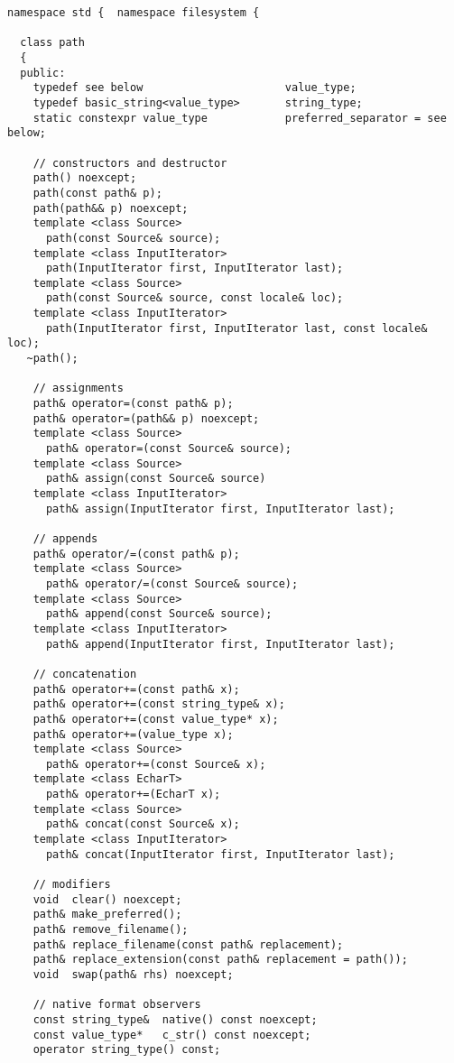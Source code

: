 \begin{verbatim}
namespace std {  namespace filesystem { 

  class path
  {
  public:
    typedef see below                      value_type;
    typedef basic_string<value_type>       string_type;
    static constexpr value_type            preferred_separator = see below;

    // constructors and destructor
    path() noexcept;
    path(const path& p);
    path(path&& p) noexcept;
    template <class Source>
      path(const Source& source);
    template <class InputIterator>
      path(InputIterator first, InputIterator last);
    template <class Source>  
      path(const Source& source, const locale& loc);
    template <class InputIterator>
      path(InputIterator first, InputIterator last, const locale& loc);
   ~path();

    // assignments
    path& operator=(const path& p);
    path& operator=(path&& p) noexcept;
    template <class Source>
      path& operator=(const Source& source);
    template <class Source>
      path& assign(const Source& source)
    template <class InputIterator>
      path& assign(InputIterator first, InputIterator last);

    // appends
    path& operator/=(const path& p);
    template <class Source>
      path& operator/=(const Source& source);
    template <class Source>
      path& append(const Source& source);
    template <class InputIterator>
      path& append(InputIterator first, InputIterator last);

    // concatenation
    path& operator+=(const path& x);
    path& operator+=(const string_type& x);
    path& operator+=(const value_type* x);
    path& operator+=(value_type x);
    template <class Source>
      path& operator+=(const Source& x);
    template <class EcharT>
      path& operator+=(EcharT x);
    template <class Source>
      path& concat(const Source& x);
    template <class InputIterator>
      path& concat(InputIterator first, InputIterator last);
    
    // modifiers
    void  clear() noexcept;
    path& make_preferred();
    path& remove_filename();
    path& replace_filename(const path& replacement);
    path& replace_extension(const path& replacement = path());
    void  swap(path& rhs) noexcept;

    // native format observers
    const string_type&  native() const noexcept;
    const value_type*   c_str() const noexcept;
    operator string_type() const;


\end{verbatim}
